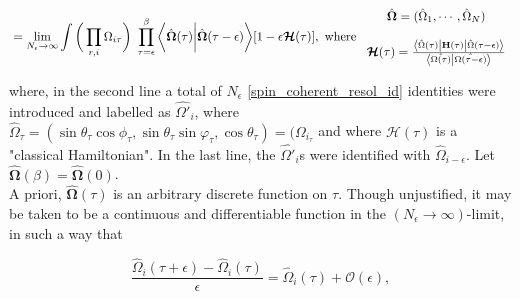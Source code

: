 \documentclass{homework}
\begin{document}
\begin{equation}
\begin{split}
    &= \lim_{N_{\epsilon} \rightarrow \infty} \int \bigg( \prod_{r, i} {{\Omega}}_{i \tau} \bigg) \textnormal{ } \prod_{\tau = \epsilon}^{\beta} \bigg\langle \hat{\bm{\Omega}}(\tau) \bigg| \hat{\bm{\Omega}}(\tau - \epsilon) \bigg\rangle [1 - \epsilon \bm{\mathcal{H}}(\tau)], \textnormal{ where } \begin{array}{cc}
         \hat{\bm{\Omega}} = (\hat{{\Omega}}_1, \cdots, \hat{{\Omega}}_N)  \\
         \\
         \bm{\mathcal{H}}(\tau) = \frac{\bra{\hat{\Omega}(\tau)} {{\bf H}}(\tau) \ket{\hat{\Omega}(\tau - \epsilon)}}{\bra{\hat{\Omega(\tau)}} \ket{\hat{\Omega(\tau - \epsilon)}}}
    \end{array} \\
    \label{generating_function_and_cl_hammiltonian}
\end{split}
\end{equation}

where, in the second line a total of $N_{\epsilon}$ \cref{spin_coherent_resol_id} identities were introduced and labelled as $\hat{\Omega'}_i$, where $\hat{\Omega}_\tau = (\sin \theta_\tau \cos \phi_\tau, \sin \theta_\tau \sin \varphi_\tau, \cos \theta_\tau) = (\Omega_i_\tau$ and where $\bm{\mathcal{H}}(\tau)$ is a "classical Hamiltonian". In the last line, the $\hat{\Omega'}_{i}$s were identified with $\hat{\Omega}_{i-\epsilon}$. Let $\hat{\bm{\Omega}}(\beta) = \hat{\bm{\Omega}}(0)$. \\

A priori, $\hat{\bm{\Omega}}(\tau)$ is an arbitrary discrete function on $\tau$. Though unjustified, it may be taken to be a continuous and differentiable function in the $(N_{\epsilon}\rightarrow\infty)$-limit, in such a way that 

\begin{equation}
    \frac{\hat{{\Omega}}_i(\tau + \epsilon) - \hat{{\Omega}}_i(\tau)}{\epsilon} = \hat{{\Omega}}_i(\tau) + \mathcal{O}(\epsilon),
\end{equation}
\end{document}
